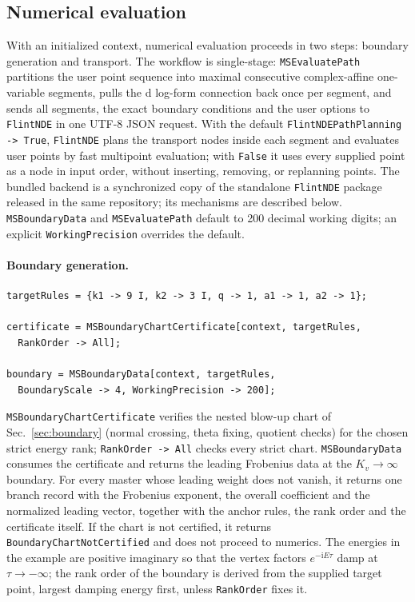 \documentclass[11pt,a4paper]{article}
\newcommand{\ii}{\mathrm i}
\begin{document}
\subsection{Numerical evaluation}
\label{sec:numerics}

With an initialized context, numerical evaluation proceeds in two steps: boundary generation and
transport. The workflow is single-stage: \texttt{MSEvaluatePath} partitions the user point
sequence into maximal consecutive complex-affine one-variable segments, pulls the d log-form
connection back once per segment, and sends all segments, the exact boundary conditions and the
user options to \texttt{FlintNDE} in one UTF-8 JSON request. With the default
\texttt{FlintNDEPathPlanning -> True}, \texttt{FlintNDE} plans the transport nodes inside each segment and
evaluates user points by fast multipoint evaluation; with \texttt{False} it uses every supplied
point as a node in input order, without inserting, removing, or replanning points. The bundled
backend is a synchronized copy of the standalone \texttt{FlintNDE} package released in the same
repository; its mechanisms are described below. \texttt{MSBoundaryData} and \texttt{MSEvaluatePath}
default to 200 decimal working digits; an explicit \texttt{WorkingPrecision} overrides the
default.

\paragraph{Boundary generation.}

\begin{verbatim}
targetRules = {k1 -> 9 I, k2 -> 3 I, q -> 1, a1 -> 1, a2 -> 1};

certificate = MSBoundaryChartCertificate[context, targetRules,
  RankOrder -> All];

boundary = MSBoundaryData[context, targetRules,
  BoundaryScale -> 4, WorkingPrecision -> 200];
\end{verbatim}
\texttt{MSBoundaryChartCertificate} verifies the nested blow-up chart of Sec.~\ref{sec:boundary}
(normal crossing, theta fixing, quotient checks) for the chosen strict energy rank;
\texttt{RankOrder -> All} checks every strict chart. \texttt{MSBoundaryData} consumes the
certificate and returns the leading Frobenius data at the $K_v\to\infty$ boundary. For every master
whose leading weight does not vanish, it returns one branch record with the Frobenius exponent, the
overall coefficient and the normalized leading vector, together with the anchor rules, the rank order
and the certificate itself.
If the chart is not certified, it returns \texttt{BoundaryChartNotCertified} and does not proceed
to numerics. The energies in the example are positive imaginary so that the vertex factors
$e^{-\ii E\tau}$ damp at $\tau\to-\infty$; the rank order of the boundary is derived from the
supplied target point, largest damping energy first, unless \texttt{RankOrder} fixes it.
\end{document}
